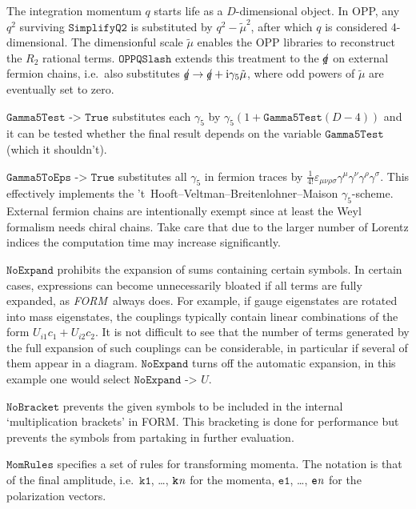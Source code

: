 \documentclass[twoside,11pt]{article}
\def\FO{\textit{FORM}}
\def\Var#1{\ensuremath{\mathit{#1}}}
\def\Vn{\Var{n}}
\def\Code#1{\ensuremath{\texttt{#1}}}
\def\ie{i.e.\ }
\def\ri{\mathrm{i}}
\def\qslash{\rlap{/}q}
\begin{document}
The integration momentum $q$ starts life as a $D$-dimensional object.  
In OPP, any $q^2$ surviving \Code{SimplifyQ2} is substituted by $q^2 - 
\tilde\mu^2$, after which $q$ is considered 4-dimensional.  The 
dimensionful scale $\tilde\mu$ enables the OPP libraries to reconstruct 
the $R_2$ rational terms.  \Code{OPPQSlash} extends this treatment to 
the $\qslash$ on external fermion chains, \ie also substitutes 
$\qslash\to \qslash + \ri\gamma_5\tilde\mu$, where odd powers of 
$\tilde\mu$ are eventually set to zero.

\Code{Gamma5Test -> True} substitutes each $\gamma_5$ by
$\gamma_5 (1 + \Code{Gamma5Test} (D - 4))$ and it can be tested whether 
the final result depends on the variable \Code{Gamma5Test} (which it 
shouldn't).

%
%
\Code{Gamma5ToEps -> True} substitutes all $\gamma_5$ in fermion 
traces by $\frac 1{4!} \varepsilon_{\mu\nu\rho\sigma} \gamma^\mu 
\gamma^\nu \gamma^\rho \gamma^\sigma$.  This effectively implements the 
't~Hooft--Veltman--Breitenlohner--Maison $\gamma_5$-scheme.  External 
fermion chains are intentionally exempt since at least the Weyl 
formalism needs chiral chains.  Take care that due to the larger number 
of Lorentz indices the computation time may increase significantly.

%
%
\Code{NoExpand} prohibits the expansion of sums containing certain symbols.
In certain cases, expressions can become unnecessarily bloated if all
terms are fully expanded, as \FO\ always does.  For example, if gauge
eigenstates are rotated into mass eigenstates, the couplings typically
contain linear combinations of the form $U_{i1} c_1 + U_{i2} c_2$.  It is
not difficult to see that the number of terms generated by the full
expansion of such couplings can be considerable, in particular if several
of them appear in a diagram.  \Code{NoExpand} turns off the automatic
expansion, in this example one would select \Code{NoExpand -> $U$}.

\Code{NoBracket} prevents the given symbols to be included in the
internal `multiplication brackets' in FORM.  This bracketing is done for
performance but prevents the symbols from partaking in further evaluation.

\Code{MomRules} specifies a set of rules for transforming momenta.  The 
notation is that of the final amplitude, \ie \Code{k1}, \dots, 
\Code{k\Vn} for the momenta, \Code{e1}, \dots, \Code{e\Vn} for the 
polarization vectors.
\end{document}
